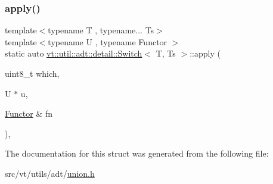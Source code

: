 \subsubsection{\texorpdfstring{apply()}{apply()}}
{\footnotesize\ttfamily template$<$typename T , typename... Ts$>$ \\
template$<$typename U , typename Functor $>$ \\
static auto \hyperlink{structvt_1_1util_1_1adt_1_1detail_1_1_switch}{vt\+::util\+::adt\+::detail\+::\+Switch}$<$ T, Ts $>$\+::apply (\begin{DoxyParamCaption}\item[{uint8\+\_\+t}]{which,  }\item[{U $\ast$}]{u,  }\item[{\hyperlink{namespacevt_af182285b57b225b163d5d8aff03cb8c2ac61e9f48e514369f0eb8ac5cebf9fb14}{Functor} \&}]{fn }\end{DoxyParamCaption})\hspace{0.3cm}{\ttfamily [inline]}, {\ttfamily [static]}}



The documentation for this struct was generated from the following file\+:\begin{DoxyCompactItemize}
\item 
src/vt/utils/adt/\hyperlink{union_8h}{union.\+h}\end{DoxyCompactItemize}
